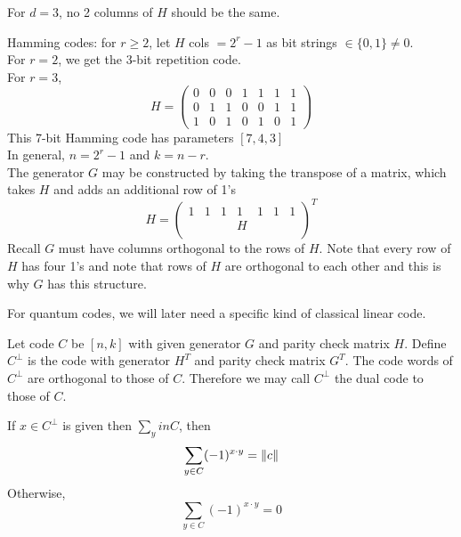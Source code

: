 \begin{example}
    For $d=3$, no 2 columns of $H$ should be the same. 
\end{example}
\begin{example}
    Hamming codes: for $r \geq 2$, let $H$ cols $= 2^r - 1$ as bit strings $\in \{0,1\} \neq 0$. \\
    For $r=2$, we get the 3-bit repetition code. \\
    For $r=3$, 
    \begin{equation}
        H = \begin{pmatrix}
            0 & 0 & 0 & 1 & 1 & 1 & 1 \\
            0 & 1 & 1 & 0 & 0 & 1 & 1 \\
            1 & 0 & 1 & 0 & 1 & 0 & 1
        \end{pmatrix}    
    \end{equation}
    This 7-bit Hamming code has parameters $[7,4,3]$\\
    In general, $n=2^r - 1$ and $k = n-r$. \\
    The generator $G$ may be constructed by taking the transpose of a matrix, which takes $H$ and adds an additional row of 1's
    \begin{equation}
        H = \begin{pmatrix}
            1 & 1 & 1 & 1 & 1 & 1 & 1 \\
             &  &  & H &  &  &  \\
             &  &  &  &  &  & 
        \end{pmatrix}^T    
    \end{equation}
    Recall $G$ must have columns orthogonal to the rows of $H$. Note that every row of $H$ has four 1's and note that rows of $H$ are orthogonal to each other and this is why $G$ has this structure. 
\end{example}
For quantum codes, we will later need a specific kind of classical linear code. 
\begin{definition}
    Let code $C$ be $[n,k]$ with given generator $G$ and parity check matrix $H$. Define $C^\perp$ is the code with generator $H^T$ and parity check matrix $G^T$. The code words of $C^\perp$ are orthogonal to those of $C$. Therefore we may call $C^\perp$ the dual code to those of $C$. 
\end{definition}
\begin{lemma}
    If $x \in C^\perp$ is given then $\sum_y in C$, then
    \begin{equation}
        \sum_{y \in C} (-1)^{x\cdot y} = \norm{c}
    \end{equation}
    Otherwise,
    \begin{equation}
        \sum_{y \in C} (-1)^{x\cdot y} = 0
    \end{equation}
\end{lemma}


